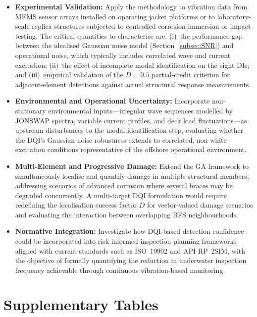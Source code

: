 \documentclass[preprint,12pt]{elsarticle}
\begin{document}
\begin{itemize}
    \item \textbf{Experimental Validation:} Apply the methodology to vibration data from MEMS sensor arrays installed on operating jacket platforms \citep{ghsoub2018structural} or to laboratory-scale replica structures subjected to controlled corrosion immersion or impact testing. The critical quantities to characterise are: (i)~the performance gap between the idealised Gaussian noise model (Section~\ref{subsec:SNR}) and operational noise, which typically includes correlated wave and current excitation; (ii)~the effect of incomplete modal identification on the eight DIs; and (iii)~empirical validation of the $D=0.5$ partial-credit criterion for adjacent-element detections against actual structural response measurements.
    \item \textbf{Environmental and Operational Uncertainty:} Incorporate non-stationary environmental inputs---irregular wave sequences modelled by JONSWAP spectra, variable current profiles, and deck load fluctuations---as upstream disturbances to the modal identification step, evaluating whether the DQI's Gaussian noise robustness extends to correlated, non-white excitation conditions representative of the offshore operational environment.
    \item \textbf{Multi-Element and Progressive Damage:} Extend the GA framework to simultaneously localise and quantify damage in multiple structural members, addressing scenarios of advanced corrosion where several braces may be degraded concurrently. A multi-target DQI formulation would require redefining the localisation success factor $D$ for vector-valued damage scenarios and evaluating the interaction between overlapping BFS neighbourhoods.
    \item \textbf{Normative Integration:} Investigate how DQI-based detection confidence could be incorporated into risk-informed inspection planning frameworks aligned with current standards such as ISO~19902 and API RP~2SIM, with the objective of formally quantifying the reduction in underwater inspection frequency achievable through continuous vibration-based monitoring.
\end{itemize}

\appendix
\section{Supplementary Tables}
\label{sec:apendice}





\end{document}

